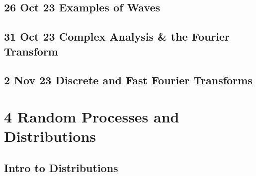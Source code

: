 \documentclass[letterpaper,10pt,english]{jupyterBook}
\begin{document}
\chapter{26 Oct 23 \sphinxhyphen{} Examples of Waves}
\label{\detokenize{content/3_waves/wave_examples:oct-23-examples-of-waves}}\label{\detokenize{content/3_waves/wave_examples::doc}}
\sphinxstepscope


\chapter{31 Oct 23 \sphinxhyphen{} Complex Analysis \& the Fourier Transform}
\label{\detokenize{content/3_waves/complex:oct-23-complex-analysis-the-fourier-transform}}\label{\detokenize{content/3_waves/complex::doc}}
\sphinxstepscope


\chapter{2 Nov 23 \sphinxhyphen{} Discrete and Fast Fourier Transforms}
\label{\detokenize{content/3_waves/DFT_FFT:nov-23-discrete-and-fast-fourier-transforms}}\label{\detokenize{content/3_waves/DFT_FFT::doc}}
\sphinxstepscope


\part{4 \sphinxhyphen{} Random Processes and Distributions}

\sphinxstepscope


\chapter{Intro to Distributions}
\label{\detokenize{content/4_distributions/distributions_intro:intro-to-distributions}}\label{\detokenize{content/4_distributions/distributions_intro::doc}}






\renewcommand{\indexname}{Index}
\printindex
\end{document}
